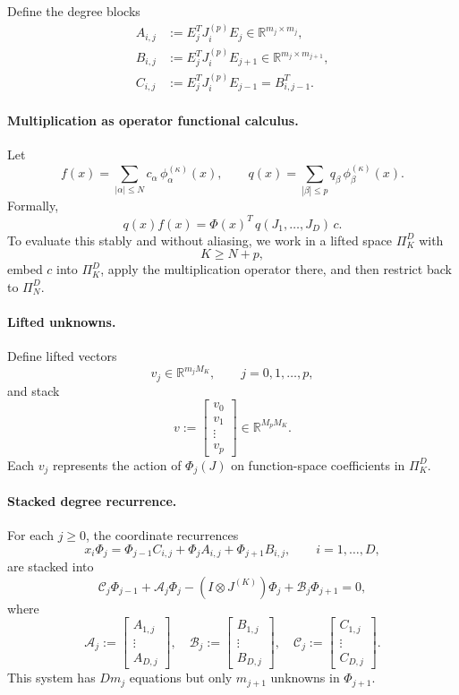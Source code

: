 \documentclass[11pt]{article}
\begin{document}
Define the degree blocks
\[
\begin{aligned}
	A_{i,j} &:= E_j^T J_i^{(p)} E_j \in \mathbb{R}^{m_j\times m_j},\\
	B_{i,j} &:= E_j^T J_i^{(p)} E_{j+1} \in \mathbb{R}^{m_j\times m_{j+1}},\\
	C_{i,j} &:= E_j^T J_i^{(p)} E_{j-1} = B_{i,j-1}^T .
\end{aligned}
\]

\paragraph{Multiplication as operator functional calculus.}
Let
\[
f(x) = \sum_{|\alpha|\le N} c_\alpha\,\phi_\alpha^{(\kappa)}(x),
\qquad
q(x) = \sum_{|\beta|\le p} q_\beta\,\phi_\beta^{(\kappa)}(x).
\]
Formally,
\[
q(x) f(x)
=
\Phi(x)^T\, q(J_1,\dots,J_D)\, c .
\]
To evaluate this stably and without aliasing, we work in a lifted space
$\Pi_K^D$ with
\[
K \ge N + p,
\]
embed $c$ into $\Pi_K^D$, apply the multiplication operator there, and then restrict back
to $\Pi_N^D$.

\paragraph{Lifted unknowns.}
Define lifted vectors
\[
v_j \in \mathbb{R}^{m_j M_K},
\qquad j=0,1,\dots,p,
\]
and stack
\[
v :=
\begin{bmatrix}
	v_0\\ v_1\\ \vdots\\ v_p
\end{bmatrix}
\in \mathbb{R}^{M_p M_K}.
\]
Each $v_j$ represents the action of $\Phi_j(J)$ on function-space coefficients in $\Pi_K^D$.

\paragraph{Stacked degree recurrence.}
For each $j\ge 0$, the coordinate recurrences
\[
x_i \Phi_j
=
\Phi_{j-1} C_{i,j}
+
\Phi_j A_{i,j}
+
\Phi_{j+1} B_{i,j},
\qquad i=1,\dots,D,
\]
are stacked into
\[
\mathcal C_j \Phi_{j-1}
+
\mathcal A_j \Phi_j
-
(I \otimes J^{(K)}) \Phi_j
+
\mathcal B_j \Phi_{j+1}
= 0,
\]
where
\[
\mathcal A_j :=
\begin{bmatrix}
	A_{1,j}\\ \vdots\\ A_{D,j}
\end{bmatrix},
\quad
\mathcal B_j :=
\begin{bmatrix}
	B_{1,j}\\ \vdots\\ B_{D,j}
\end{bmatrix},
\quad
\mathcal C_j :=
\begin{bmatrix}
	C_{1,j}\\ \vdots\\ C_{D,j}
\end{bmatrix}.
\]
This system has $D m_j$ equations but only $m_{j+1}$ unknowns in $\Phi_{j+1}$.
\end{document}
